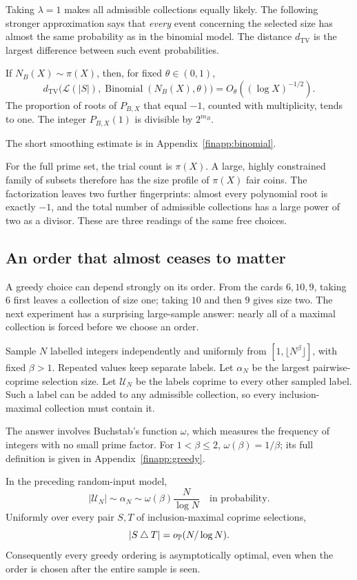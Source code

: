 Taking $\lambda=1$ makes all admissible collections equally likely.
The following stronger approximation says that \emph{every} event
concerning the selected size has almost the same probability as in the
binomial model.  The distance $d_{\mathrm{TV}}$ is the largest
difference between such event probabilities.
\begin{corollary}\label{fin:binomialtv}
If $N_B(X)\sim\pi(X)$, then, for fixed $\theta\in(0,1)$,
\[
 d_{\mathrm{TV}}\bigl(\mathcal L(|S|),
                 \operatorname{Binomial}(N_B(X),\theta)\bigr)
 =O_\theta((\log X)^{-1/2}).
\]
The proportion of roots of $P_{B,X}$ that equal $-1$, counted with
multiplicity, tends to one.  The integer $P_{B,X}(1)$ is divisible by
$2^{m_B}$.
\end{corollary}
The short smoothing estimate is in Appendix~\ref{finapp:binomial}.

For the full prime set, the trial count is $\pi(X)$.
A large, highly constrained family of subsets therefore has the size
profile of $\pi(X)$ fair coins.  The factorization leaves two further
fingerprints: almost every polynomial root is exactly $-1$, and
the total number of admissible collections has a large power of two
as a divisor.  These are three readings of the same free choices.

\subsection{An order that almost ceases to matter}
A greedy choice can depend strongly on its order.
From the cards $6,10,9$, taking $6$ first leaves a collection of size
one; taking $10$ and then $9$ gives size two.
The next experiment has a surprising large-sample answer:
nearly all of a maximal collection is forced before we choose an order.

Sample $N$ labelled integers independently and uniformly from
$[1,\lfloor N^\beta\rfloor]$, with fixed $\beta>1$.
Repeated values keep separate labels.  Let $\alpha_N$ be the largest
pairwise-coprime selection size.  Let $\mathcal U_N$ be the labels
coprime to every other sampled label.  Such a label can be added to
any admissible collection, so every inclusion-maximal collection
must contain it.

The answer involves Buchstab's function $\omega$, which measures the
frequency of integers with no small prime factor.
For $1<\beta\le2$, $\omega(\beta)=1/\beta$; its full definition is
given in Appendix~\ref{finapp:greedy}.
\begin{theorem}\label{fin:greedy}
In the preceding random-input model,
\[
 |\mathcal U_N|\sim\alpha_N\sim
 \omega(\beta)\frac{N}{\log N}
 \quad\text{in probability}.
\]
Uniformly over every pair $S,T$ of inclusion-maximal coprime selections,
\[
 |S\mathbin{\triangle}T|=o_{\mathbb P}(N/\log N).
\]
Consequently every greedy ordering is asymptotically optimal, even when
the order is chosen after the entire sample is seen.
\end{theorem}

